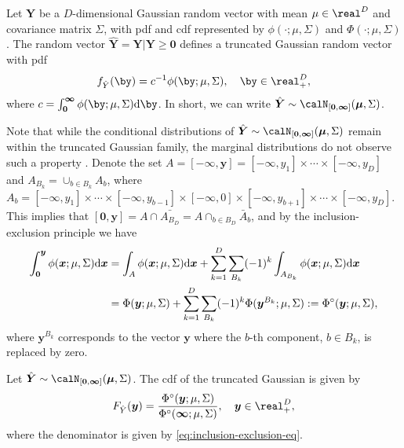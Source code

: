 \documentclass[12pt]{article}
\begin{document}
\begin{definition}
\label{def:mvnorm_trunc}

Let $\bm Y$ be a $D$-dimensional Gaussian random vector with mean $\mu \in \real^D$ and covariance matrix $\Sigma$, with pdf and cdf represented by $\phi(\cdot;\mu,\Sigma)$ and $\Phi(\cdot;\mu,\Sigma)$. The random vector $\hat{\bm Y} = \bm Y| \bm Y\geq \bm 0$ defines a truncated Gaussian random vector with pdf
%
$$
f_{\hat Y}(\by) = c^{-1} \phi(\by;\mu,\Sigma), \quad \by \in \real^D_+,
$$
%
where $c=\int_{\bm 0}^{\bm \infty} \phi(\by;\mu,\Sigma)\text d \by$. In short, we can write $\hat{\bm Y} \sim \calN_{\left[ \bm 0 , \bm \infty \right]}(\bm \mu, \Sigma)$. 
\end{definition}

Note that while the conditional distributions of $\hat{\bm Y}\sim \calN_{\left[ \bm 0 , \bm \infty \right]}(\bm \mu, \Sigma)$ remain within the truncated Gaussian family, the marginal distributions do not observe such a property \citep{Horrace:2005}.
Denote the set $A = [-\bm \infty, \bm y] = [-\infty,y_1]\times\cdots\times[-\infty,y_D] $ and 
$A_{B_k} = \cup_{b\in B_k} A_b$, where $A_b = [-\infty,y_1]\times\cdots\times[-\infty,y_{b-1}]\times[-\infty,0]\times[-\infty,y_{b+1}]\times\cdots\times[-\infty,y_D]$.
This implies that 
$[\bm 0,\bm y] = A \cap \bar{A_{B_D}} = A \cap_{b \in B_D} \bar{A}_b$, 
and by the inclusion-exclusion principle we have
%
\begin{align}
\int_{\bm 0}^{\bm y} \phi(\bm x;\mu,\Sigma) \text d \bm x &= \int_{A} \phi(\bm x;\mu,\Sigma) \text d \bm x + \sum_{k=1}^D \sum_{B_k}(-1)^k \int_{A_{B_k}} \phi(\bm x;\mu,\Sigma) \text d \bm x   \nonumber \\
&= \Phi(\bm y;\mu,\Sigma) + \sum_{k=1}^D \sum_{B_k}(-1)^k \Phi(\bm y^{B_k};\mu,\Sigma):= \Phi^\circ(\bm y;\mu,\Sigma)\label{eq:inclusion-exclusion-eq},
\end{align}
%
where $\bm y^{B_k}$ corresponds to the vector $\bm y$ where the $b$-th component, $b\in B_k$, is replaced by zero. 
%
\begin{definition}
Let $\hat{\bm Y}\sim \calN_{\left[ \bm 0 , \bm \infty \right]}(\bm \mu, \Sigma)$. The cdf of the truncated Gaussian is given by
%
$$
F_{\hat{Y}}(\bm y) = \frac{\Phi^\circ(\bm y;\mu,\Sigma)}
{\Phi^\circ(\bm \infty;\mu,\Sigma)}, \quad \bm y \in \real^D_+,
$$
where the denominator is given by \eqref{eq:inclusion-exclusion-eq}.
\end{definition}
\end{document}
